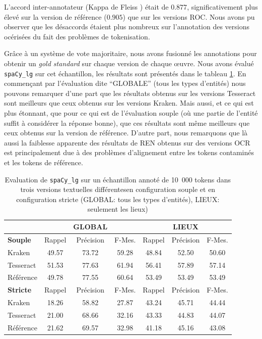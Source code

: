 L'accord inter-annotateur (Kappa de  Fleiss \cite{fleiss2013statistical}) était de $0.877$, significativement plus élevé sur la version de référence ($0.905$) que sur les versions ROC. Nous avons pu observer que les désaccords étaient plus nombreux sur l'annotation des versions océrisées du fait des problèmes de tokenisation.

Grâce à un système de vote majoritaire, nous avons fusionné les annotations pour obtenir un \textit{gold standard} sur chaque version de chaque œuvre.
 Nous avons évalué \texttt{spaCy\_lg} sur cet échantillon, les résultats sont présentés dans le tableau \ref{tab:eval-supervise}.
 En commençant par l'évaluation dite ``GLOBALE'' (tous les types d'entités) nous pouvons remarquer d'une part que les résultats obtenus sur les versions Tesseract sont meilleurs que ceux obtenus sur les versions Kraken. Mais aussi, et ce qui est plus étonnant, que pour ce qui est de l'évaluation souple (où une partie de l'entité suffit à considérer la réponse bonne), que ces résultats sont même meilleurs que ceux obtenus sur la version de référence.
  D'autre part, nous remarquons que là aussi la faiblesse apparente des résultats de REN obtenus sur des versions OCR est principalement due à des problèmes d'alignement entre les tokens contaminés et les tokens de référence. 
\begin{table}[h!]
\scriptsize{\begin{tabular}{l|ccc|ccc}
 &		&	GLOBAL	&		&		&	LIEUX	&		\\
\hline
 \hline
\textbf{Souple}	&	Rappel		&Précision	&	F-Mes.	&	Rappel&		Précision		&F-Mes.	\\
 \hline
Kraken	&	49.57	&	73.72 	&	59.28	&	48.84	&	52.50	&	50.60	\\
													
Tesseract	&	51.53	&	77.63	&	61.94	&	56.41	&	57.89	&	57.14	\\
													
Référence	&	49.78	&	77.55	&	60.64	&	53.49	&	53.49	&	53.49	\\
\hline
\hline
\textbf{Stricte}	&	Rappel		&Précision	&	F-Mes.	&	Rappel&		Précision		&F-Mes.	 \\
\hline
Kraken	&	18.26	&	58.82	&	27.87	&	43.24	&	45.71	&	44.44	\\
Tesseract	&	21.00	&	68.66	&	32.16	&	43.33	&	44.83	&	44.07	\\
Référence	&	21.62	&	69.57	&	32.98	&	41.18	&	45.16	&	43.08	\\
\hline
\hline
\end{tabular}}
\caption{Evaluation de \texttt{spaCy\_lg} sur un échantillon annoté de 10~000 tokens dans trois versions textuelles différentes\label{tab:eval-supervise} en configuration souple et en configuration stricte (GLOBAL: tous les types d'entités), LIEUX: seulement les lieux)}
 \end{table}

